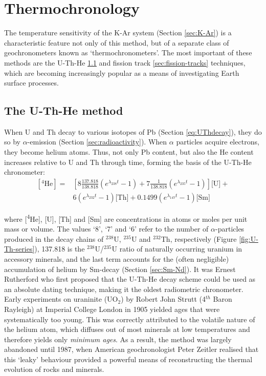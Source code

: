 \chapter{Thermochronology}

The temperature sensitivity of the K-Ar system (Section
\ref{sec:K-Ar}) is a characteristic feature not only of this method,
but of a separate class of geochronometers known as
`thermochronometers'.  The most important of these methods are the
U-Th-He \ref{sec:U-Th-He} and fission track \ref{sec:fission-tracks}
techniques, which are becoming increasingly popular as a means of
investigating Earth surface processes.

\section{The U-Th-He method}
\label{sec:U-Th-He}

When U and Th decay to various isotopes of Pb (Section
\ref{eq:UThdecay}), they do so by $\alpha$-emission (Section
\ref{sec:radioactivity}). When $\alpha$ particles acquire electrons,
they become helium atoms. Thus, not only Pb content, but also the He
content increases relative to U and Th through time, forming the basis
of the U-Th-He chronometer:
\begin{equation}
\begin{split}
  \left[^4\mbox{He}\right] = &
  \left[8 \frac{137.818}{138.818} (e^{\lambda_{238}t} - 1) +
    7 \frac{1}{138.818} (e^{\lambda_{235}t} - 1) \right] \mbox{[U]} +\\
  ~ & 6 (e^{\lambda_{232}t} - 1) \mbox{[Th]} +
  0.1499 (e^{\lambda_{147}t} - 1) \mbox{[Sm]}
\end{split}
\label{eq:U-Th-He}
\end{equation}

\noindent where [\textsuperscript{4}He], [U], [Th] and [Sm] are
concentrations in atoms or moles per unit mass or volume.  The values
`8', `7' and `6' refer to the number of $\alpha$-particles produced in
the decay chains of $^{238}$U, $^{235}$U and $^{232}$Th, respectively
(Figure \ref{fig:U-Th-series}), 137.818 is the $^{238}$U/$^{235}$U
ratio of naturally occurring uranium in accessory minerals, and the
last term accounts for the (often negligible) accumulation of helium
by Sm-decay (Section \ref{sec:Sm-Nd}). It was Ernest Rutherford who
first proposed that the U-Th-He decay scheme could be used as an
absolute dating technique, making it the oldest radiometric
chronometer. Early experiments on uraninite (UO$_2$) by Robert John
Strutt (4$^{th}$ Baron Rayleigh) at Imperial College London in 1905
yielded ages that were systematically too young. This was correctly
attributed to the volatile nature of the helium atom, which diffuses
out of most minerals at low temperatures and therefore yields only
\emph{minimum ages}. As a result, the method was largely abandoned
until 1987, when American geochronologist Peter Zeitler realised that
this `leaky' behaviour provided a powerful means of reconstructing the
thermal evolution of rocks and minerals. \\

